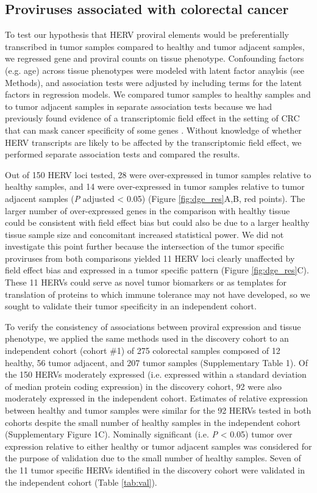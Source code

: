 \subsection*{Proviruses associated with colorectal cancer}
To test our hypothesis that HERV proviral elements would be preferentially transcribed in tumor samples compared to healthy and tumor adjacent samples, we regressed gene and proviral counts on tissue phenotype.
Confounding factors (e.g. age) across tissue phenotypes were modeled with latent factor anaylsis (see Methods), and association tests were adjusted by including terms for the latent factors in regression models.
We compared tumor samples to healthy samples and to tumor adjacent samples in separate association tests because we had previously found evidence of a transcriptomic field effect in the setting of CRC that can mask cancer specificity of some genes \citep{Dampier2020}.
Without knowledge of whether HERV transcripts are likely to be affected by the transcriptomic field effect, we performed separate association tests and compared the results.

Out of 150 HERV loci tested, 28 were over-expressed in tumor samples relative to healthy samples, and 14 were over-expressed in tumor samples relative to tumor adjacent samples (\emph{P} adjusted < 0.05) (Figure \ref{fig:dge_res}A,B, red points).
The larger number of over-expressed genes in the comparison with healthy tissue could be consistent with field effect bias but could also be due to a larger healthy tissue sample size and concomitant increased statistical power.
We did not investigate this point further because the intersection of the tumor specific proviruses from both comparisons yielded 11 HERV loci clearly unaffected by field effect bias and expressed in a tumor specific pattern (Figure \ref{fig:dge_res}C).
These 11 HERVs could serve as novel tumor biomarkers or as templates for translation of proteins to which immune tolerance may not have developed, so we sought to validate their tumor specificity in an independent cohort.

To verify the consistency of associations between proviral expression and tissue phenotype, we applied the same methods used in the discovery cohort to an independent cohort (cohort \#1) of 275 colorectal samples composed of 12 healthy, 56 tumor adjacent, and 207 tumor samples (Supplementary Table 1).
Of the 150 HERVs moderately expressed (i.e. expressed within a standard deviation of median protein coding expression) in the discovery cohort, 92 were also moderately expressed in the independent cohort.
Estimates of relative expression between healthy and tumor samples were similar for the 92 HERVs tested in both cohorts despite the small number of healthy samples in the independent cohort (Supplementary Figure 1C).
Nominally significant (i.e. \emph{P} < 0.05) tumor over expression relative to either healthy or tumor adjacent samples was considered for the purpose of validation due to the small number of healthy samples.
Seven of the 11 tumor specific HERVs identified in the discovery cohort were validated in the independent cohort (Table \ref{tab:val}).

